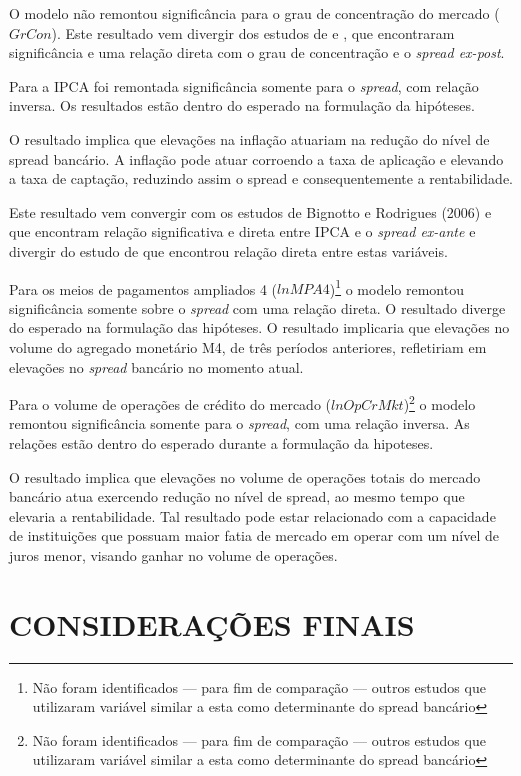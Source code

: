 \documentclass[
  12pt,
  12pt,
  openright,
  oneside,
  a4paper,
  chapter=TITLE,
  section=TITLE,
  subsection=TITLE,
  subsubsection=TITLE,
  portugues,
  sumario=tradicional]{abntex2}
\begin{document}
O modelo não remontou significância para o grau de concentração do mercado (\(GrCon\)). Este resultado vem divergir dos estudos de \textcite{dantas:2012} e \textcite{almeida:2013}, que encontraram significância e uma relação direta com o grau de concentração e o \emph{spread ex-post}.

Para a IPCA foi remontada significância somente para o \emph{spread}, com relação inversa. Os resultados estão dentro do esperado na formulação da hipóteses.

O resultado implica que elevações na inflação atuariam na redução do nível de spread bancário. A inflação pode atuar corroendo a taxa de aplicação e elevando a taxa de captação, reduzindo assim o spread e consequentemente a rentabilidade.

Este resultado vem convergir com os estudos de Bignotto e Rodrigues (2006) e \textcite{durigan:2018} que encontram relação significativa e direta entre IPCA e o \emph{spread ex-ante} e divergir do estudo de \textcite{aronovich:1994} que encontrou relação direta entre estas variáveis.

Para os meios de pagamentos ampliados 4 (\(lnMPA4\))\footnote{Não foram identificados — para fim de comparação — outros estudos que utilizaram variável similar a esta como determinante do spread bancário} o modelo remontou significância somente sobre o \emph{spread} com uma relação direta. O resultado diverge do esperado na formulação das hipóteses. O resultado implicaria que elevações no volume do agregado monetário M4, de três períodos anteriores, refletiriam em elevações no \emph{spread} bancário no momento atual.

Para o volume de operações de crédito do mercado (\(lnOpCrMkt\))\footnote{Não foram identificados — para fim de comparação — outros estudos que utilizaram variável similar a esta como determinante do spread bancário} o modelo remontou significância somente para o \emph{spread}, com uma relação inversa. As relações estão dentro do esperado durante a formulação da hipoteses.

O resultado implica que elevações no volume de operações totais do mercado bancário atua exercendo redução no nível de spread, ao mesmo tempo que elevaria a rentabilidade. Tal resultado pode estar relacionado com a capacidade de instituições que possuam maior fatia de mercado em operar com um nível de juros menor, visando ganhar no volume de operações.

\textual
\pagestyle{simple}
\parindent 1.50cm

\chapter{CONSIDERAÇÕES FINAIS}
\end{document}
